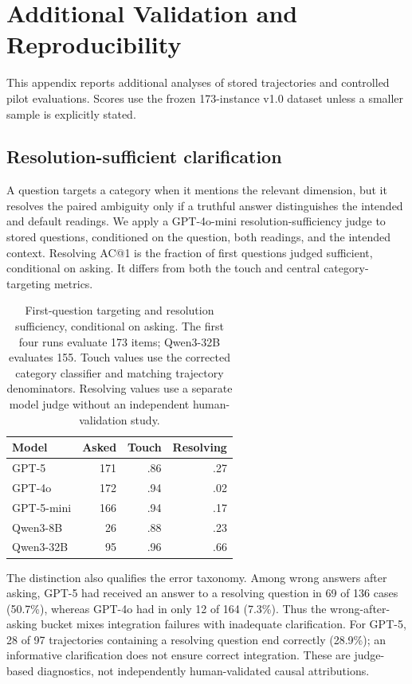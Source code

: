 \section{Additional Validation and Reproducibility}
\label{app:additional_validation}

This appendix reports additional analyses of stored trajectories and controlled pilot evaluations. Scores use the frozen 173-instance v1.0 dataset unless a smaller sample is explicitly stated.

\subsection{Resolution-sufficient clarification}
A question targets a category when it mentions the relevant dimension, but it resolves the paired ambiguity only if a truthful answer distinguishes the intended and default readings. We apply a GPT-4o-mini resolution-sufficiency judge to stored questions, conditioned on the question, both readings, and the intended context. Resolving AC@1 is the fraction of first questions judged sufficient, conditional on asking. It differs from both the touch and central category-targeting metrics.

\begin{table}[t]
\centering
\small
\begin{tabular}{@{}lrrr@{}}
\toprule
Model & Asked & Touch & Resolving \\
\midrule
GPT-5 & 171 & .86 & .27 \\
GPT-4o & 172 & .94 & .02 \\
GPT-5-mini & 166 & .94 & .17 \\
Qwen3-8B & 26 & .88 & .23 \\
Qwen3-32B & 95 & .96 & .66 \\
\bottomrule
\end{tabular}
\caption{First-question targeting and resolution sufficiency, conditional on asking. The first four runs evaluate 173 items; Qwen3-32B evaluates 155. Touch values use the corrected category classifier and matching trajectory denominators. Resolving values use a separate model judge without an independent human-validation study.}
\label{tab:resolving}
\end{table}

The distinction also qualifies the error taxonomy. Among wrong answers after asking, GPT-5 had received an answer to a resolving question in 69 of 136 cases (50.7\%), whereas GPT-4o had in only 12 of 164 (7.3\%). Thus the wrong-after-asking bucket mixes integration failures with inadequate clarification. For GPT-5, 28 of 97 trajectories containing a resolving question end correctly (28.9\%); an informative clarification does not ensure correct integration. These are judge-based diagnostics, not independently human-validated causal attributions.

